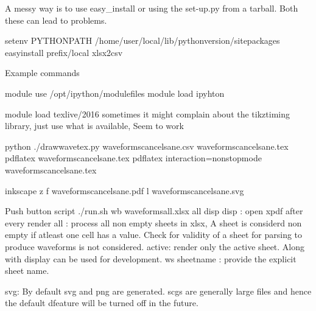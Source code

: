 \documentclass[letterpaper,10pt,english]{sphinxmanual}
\begin{document}
A messy way is to use easy\_install or using the set-up.py from a tarball. Both
these can lead to problems.

%
\begin{sphinxVerbatim}[commandchars=\\\{\}]
 

setenv PYTHONPATH /home/\PYGZlt{}user\PYGZgt{}/local/lib/\PYGZlt{}python\PYGZus{}version\PYGZgt{}/site\PYGZhy{}packages
easy\PYGZus{}install \PYGZhy{}\PYGZhy{}prefix/local xlsx2csv
\end{sphinxVerbatim}

Example commands

%
\begin{sphinxVerbatim}[commandchars=\\\{\}]
module use /opt/ipython/modulefiles
module load ipyhton

module load texlive/2016
\PYGZsh{} sometimes it might complain about the tikz\PYGZhy{}timing library, just use what is
\PYGZsh{} available, Seem to work

python ./draw\PYGZus{}wave\PYGZus{}tex.py waveforms\PYGZus{}cancel\PYGZus{}sane.csv waveforms\PYGZus{}cancel\PYGZus{}sane.tex
pdflatex waveforms\PYGZus{}cancel\PYGZus{}sane.tex
pdflatex \PYGZhy{}interaction=nonstopmode waveforms\PYGZus{}cancel\PYGZus{}sane.tex

inkscape \PYGZhy{}z \PYGZhy{}f waveforms\PYGZus{}cancel\PYGZus{}sane.pdf \PYGZhy{}l waveforms\PYGZus{}cancel\PYGZus{}sane.svg

\PYGZsh{} Push button script
./run.sh \PYGZhy{}wb waveforms\PYGZus{}all.xlsx \PYGZhy{}all \PYGZhy{}disp
\PYGZhy{}disp : open xpdf after every render
\PYGZhy{}all  : process all non empty sheets in xlsx, A sheet is considerd non empty if atleast one cell has a value.
        Check for validity of a sheet for parsing to produce waveforms is not considered.
\PYGZhy{}active: render only the active sheet. Along with display can be used for development.
\PYGZlt{}\PYGZhy{}ws sheet\PYGZus{}name\PYGZgt{} : provide the explicit sheet name.

svg: By default svg and png are generated. scg\PYGZsq{}s are generally large files and hence the default dfeature will be turned off in the future.
\end{sphinxVerbatim}
\end{document}

